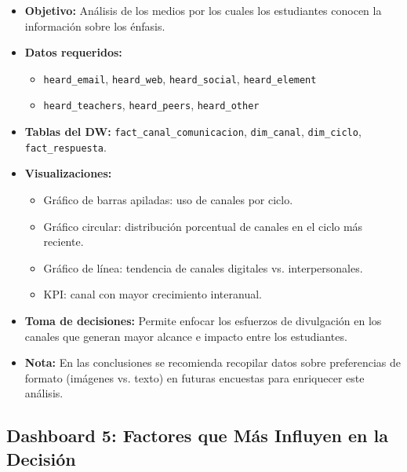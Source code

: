 \documentclass[12pt, letterpaper]{article}
\begin{document}
\begin{itemize}
  \item \textbf{Objetivo:} Análisis de los medios por los cuales los estudiantes conocen la información sobre los énfasis.
  \item \textbf{Datos requeridos:}
  \begin{itemize}
    \item \texttt{heard\_email}, \texttt{heard\_web}, \texttt{heard\_social}, \texttt{heard\_element}
    \item \texttt{heard\_teachers}, \texttt{heard\_peers}, \texttt{heard\_other}
  \end{itemize}
  \item \textbf{Tablas del DW:} \texttt{fact\_canal\_comunicacion}, \texttt{dim\_canal}, \texttt{dim\_ciclo}, \texttt{fact\_respuesta}.
  \item \textbf{Visualizaciones:}
  \begin{itemize}
    \item Gráfico de barras apiladas: uso de canales por ciclo.
    \item Gráfico circular: distribución porcentual de canales en el ciclo más reciente.
    \item Gráfico de línea: tendencia de canales digitales vs. interpersonales.
    \item KPI: canal con mayor crecimiento interanual.
  \end{itemize}
  \item \textbf{Toma de decisiones:} Permite enfocar los esfuerzos de divulgación en los canales que generan mayor alcance e impacto entre los estudiantes.
  \item \textbf{Nota:} En las conclusiones se recomienda recopilar datos sobre preferencias de formato (imágenes vs. texto) en futuras encuestas para enriquecer este análisis.
\end{itemize}

\subsection{Dashboard 5: Factores que Más Influyen en la Decisión}
\end{document}
